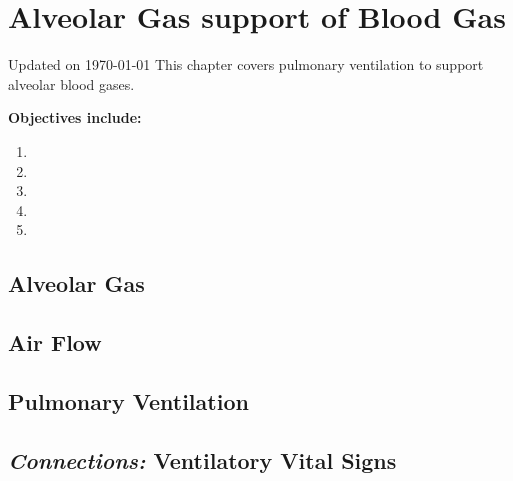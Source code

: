 \chapter{Alveolar Gas support of Blood Gas}\label{chp:alveolar_oxygen}
Updated on \today
\minitoc
This chapter covers pulmonary ventilation to support alveolar blood gases.

\vspace{5mm}

\textbf{Objectives include:}
\begin{enumerate}
    \item
    \item
    \item
    \item
    \item
\end{enumerate}

\section{Alveolar Gas}

\section{Air Flow}

\section{Pulmonary Ventilation}

\section{\textit{Connections:} Ventilatory Vital Signs}

\printbibliography[heading=subbibintoc]